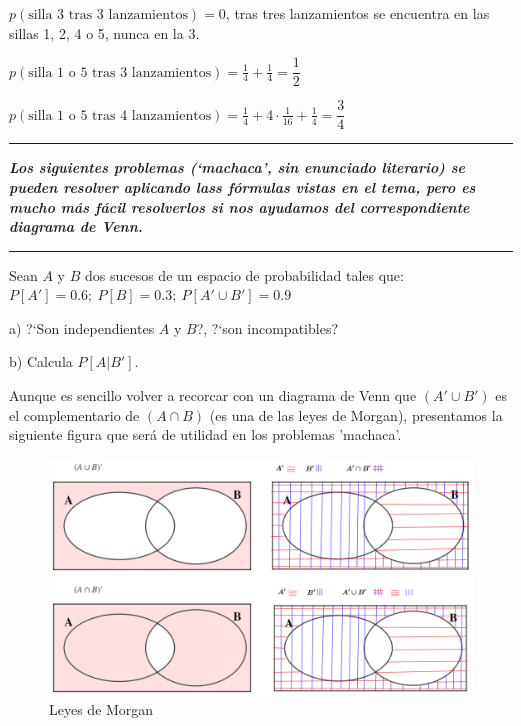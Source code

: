 $p(\text{silla 3 tras 3 lanzamientos})=0$, tras tres lanzamientos se encuentra en las sillas 1, 2, 4 o 5, nunca en la 3.

$p(\text{silla 1 o 5 tras 3 lanzamientos})=\frac 1 4 + \frac 1 4 = \dfrac 1 2$

$p(\text{silla 1 o 5 tras 4 lanzamientos})=\frac 1 4+4\cdot \frac 1 {16} + \frac 1 4=\dfrac 3 4$


\vspace{1cm}
\begin{adjustwidth}{50pt}{50pt}
	\textcolor{gris}{\rule{70mm}{0.1mm}}
	
	\begin{destacado}
	\textbf{\emph{Los siguientes problemas (`machaca', sin enunciado literario) se pueden resolver aplicando lass fórmulas vistas en el tema, pero es mucho más fácil resolverlos si nos ayudamos del correspondiente diagrama de Venn.}}
	\end{destacado}
	\begin{flushright}
	\rule{70mm}{0.1mm}	
	\end{flushright}
\end{adjustwidth}
\vspace{1cm}



\vspace{5mm}
\begin{ejemplo}
\begin{ejer}
Sean $A$ y $B$ dos sucesos de un espacio de probabilidad tales que: $P[A'] = 0.6 ; \ P[B] = 0.3 ; \ P[A' \cup B'] = 0.9$

a) ?`Son independientes $A$ y $B$?, ?`son incompatibles?

b) Calcula $P[A | B']$.	
\end{ejer}
\end{ejemplo}
Aunque es sencillo volver a recorcar con un diagrama de Venn que $(A' \cup B')$ es el complementario de $(A\cap B)$ (es una de las leyes de Morgan), presentamos la siguiente figura que será de utilidad en los problemas 'machaca'.


	\begin{figure}[H]
		\centering
		\includegraphics[width=.75\textwidth]{imagenes/imagenes02/T02IM38.png}
		\caption*{Leyes de Morgan}
	\end{figure}


